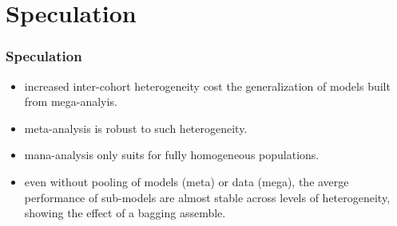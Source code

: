 \documentclass{beamer}
\begin{document}
\section{Speculation}
\begin{frame}
  \frametitle{Speculation}
  \begin{itemize}
  \item increased inter-cohort heterogeneity cost the generalization
    of models built from mega-analyis.
  \item meta-analysis is robust to such heterogeneity.
  \item mana-analysis only suits for fully homogeneous populations.
  \item even without pooling of models (meta) or data (mega), the
    averge performance of sub-models are almost stable across levels
    of heterogeneity, showing the effect of a bagging assemble.
  \end{itemize}
\end{frame}
\end{document}

